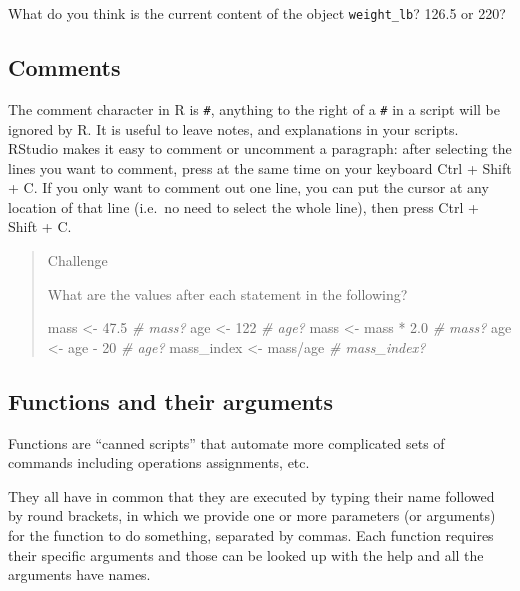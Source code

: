 \documentclass[]{book}
\newenvironment{Shaded}{\begin{snugshade}}{\end{snugshade}}
\newcommand{\DecValTok}[1]{\textcolor[rgb]{0.00,0.00,0.81}{{#1}}}
\newcommand{\FloatTok}[1]{\textcolor[rgb]{0.00,0.00,0.81}{{#1}}}
\newcommand{\StringTok}[1]{\textcolor[rgb]{0.31,0.60,0.02}{{#1}}}
\newcommand{\CommentTok}[1]{\textcolor[rgb]{0.56,0.35,0.01}{\textit{{#1}}}}
\newcommand{\NormalTok}[1]{{#1}}
\theoremstyle{definition}
\theoremstyle{definition}
\theoremstyle{remark}
\begin{document}
What do you think is the current content of the object
\texttt{weight\_lb}? 126.5 or 220?

\subsection{Comments}\label{comments}

The comment character in R is \texttt{\#}, anything to the right of a
\texttt{\#} in a script will be ignored by R. It is useful to leave
notes, and explanations in your scripts. RStudio makes it easy to
comment or uncomment a paragraph: after selecting the lines you want to
comment, press at the same time on your keyboard Ctrl + Shift + C. If
you only want to comment out one line, you can put the cursor at any
location of that line (i.e.~no need to select the whole line), then
press Ctrl + Shift + C.

\begin{quote}
Challenge

What are the values after each statement in the following?

\begin{Shaded}
\begin{Highlighting}[]
\NormalTok{mass <-}\StringTok{ }\FloatTok{47.5}            \CommentTok{# mass?}
\NormalTok{age  <-}\StringTok{ }\DecValTok{122}             \CommentTok{# age?}
\NormalTok{mass <-}\StringTok{ }\NormalTok{mass *}\StringTok{ }\FloatTok{2.0}      \CommentTok{# mass?}
\NormalTok{age  <-}\StringTok{ }\NormalTok{age -}\StringTok{ }\DecValTok{20}        \CommentTok{# age?}
\NormalTok{mass_index <-}\StringTok{ }\NormalTok{mass/age  }\CommentTok{# mass_index?}
\end{Highlighting}
\end{Shaded}
\end{quote}

\subsection{Functions and their
arguments}\label{functions-and-their-arguments}

Functions are ``canned scripts'' that automate more complicated sets of
commands including operations assignments, etc.

They all have in common that they are executed by typing their name
followed by round brackets, in which we provide one or more parameters
(or arguments) for the function to do something, separated by commas.
Each function requires their specific arguments and those can be looked
up with the help and all the arguments have names.
\end{document}
